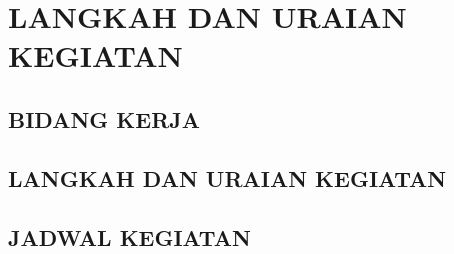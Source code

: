 \chapter{LANGKAH DAN URAIAN KEGIATAN}
\label{chap:langkahuraian}

\paragraphtextstyle

\section{BIDANG KERJA}
\label{sec:bidangkerja}

\section{LANGKAH DAN URAIAN KEGIATAN}
\label{sec:langkahuraian}

\section{JADWAL KEGIATAN}
\label{sec:jadwalkegiatan}
